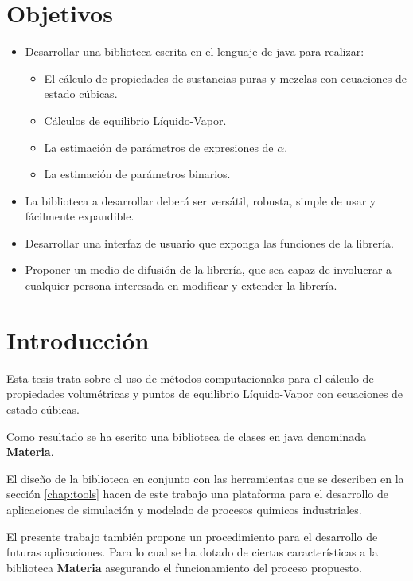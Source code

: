 \chapter{Objetivos}

\begin{itemize}
	\item Desarrollar una biblioteca escrita en el lenguaje de java para realizar:
	\begin{itemize}
		\item El cálculo de propiedades de sustancias puras y mezclas con ecuaciones de estado cúbicas.
		\item Cálculos de equilibrio Líquido-Vapor.
		\item La estimación de parámetros de expresiones de $\alpha$.
		\item La estimación de parámetros binarios.
	\end{itemize}
	\item La biblioteca a desarrollar deberá ser versátil, robusta, simple de usar y fácilmente expandible.
	\item Desarrollar una interfaz de usuario que exponga las funciones de la librería.
	\item Proponer un medio de difusión de la librería, que sea capaz de involucrar a cualquier persona interesada en modificar y extender la librería.
\end{itemize}

\chapter{Introducción}

	Esta tesis trata sobre el uso de métodos computacionales para el cálculo de propiedades volumétricas y puntos de equilibrio Líquido-Vapor con ecuaciones de estado cúbicas. 

	Como resultado se ha escrito una biblioteca de clases en java denominada \textbf{Materia}.

	El diseño de la biblioteca en conjunto con las herramientas que se describen en la sección \ref{chap:tools} hacen de este trabajo una plataforma para el desarrollo de aplicaciones de simulación y modelado de procesos quimicos industriales.

	El presente trabajo también propone un procedimiento para el desarrollo de futuras aplicaciones. Para lo cual se ha dotado de ciertas características a la biblioteca \textbf{Materia} asegurando el funcionamiento del proceso propuesto.

